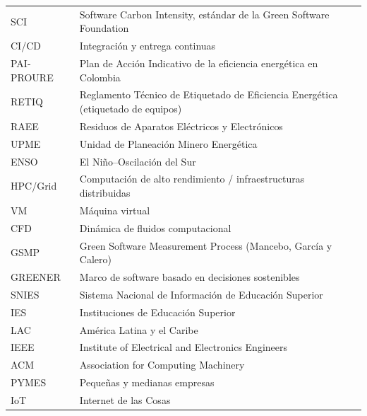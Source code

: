 \documentclass[conference]{IEEEtran}
\begin{document}
\begin{table}[H]
\begin{tabular}{@{}R{2.1cm} R{5.4cm}@{}}
SCI & Software Carbon Intensity, est\'andar de la Green Software Foundation \\
CI/CD & Integraci\'on y entrega continuas \\
PAI-PROURE & Plan de Acci\'on Indicativo de la eficiencia energ\'etica en Colombia \\
RETIQ & Reglamento T\'ecnico de Etiquetado de Eficiencia Energ\'etica (etiquetado de equipos) \\
RAEE & Residuos de Aparatos El\'ectricos y Electr\'onicos \\
UPME & Unidad de Planeaci\'on Minero Energ\'etica \\
ENSO & El Niño--Oscilaci\'on del Sur \\
HPC/Grid & Computaci\'on de alto rendimiento / infraestructuras distribuidas \\
VM & M\'aquina virtual \\
CFD & Din\'amica de fluidos computacional \\
GSMP & Green Software Measurement Process (Mancebo, Garc\'ia y Calero) \\
GREENER & Marco de software basado en decisiones sostenibles \\
SNIES & Sistema Nacional de Informaci\'on de Educaci\'on Superior \\
IES & Instituciones de Educaci\'on Superior \\
LAC & Am\'erica Latina y el Caribe \\
IEEE & Institute of Electrical and Electronics Engineers \\
ACM & Association for Computing Machinery \\
PYMES & Pequeñas y medianas empresas \\
IoT & Internet de las Cosas \\
\bottomrule
\end{tabular}
\end{table}
\end{document}
